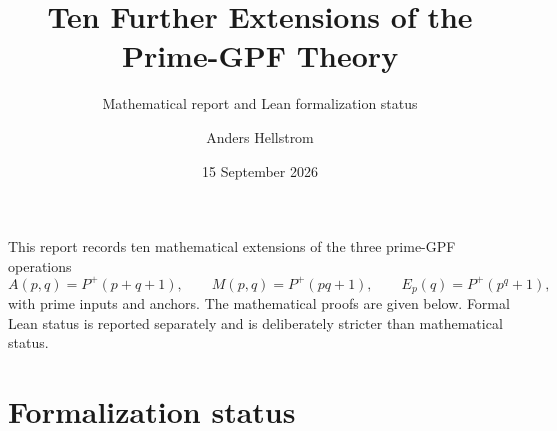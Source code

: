 \documentclass[10pt,a4paper]{scrartcl}
\title{Ten Further Extensions of the Prime-GPF Theory}
\subtitle{Mathematical report and Lean formalization status}
\author{Anders Hellstrom}
\date{15 September 2026}
\begin{document}
\maketitle
\tableofcontents
\bigskip

This report records ten mathematical extensions of the three prime-GPF operations
\[
A(p,q)=P^+(p+q+1),\qquad
M(p,q)=P^+(pq+1),\qquad
E_p(q)=P^+(p^q+1),
\]
with prime inputs and anchors. The mathematical proofs are given below. Formal Lean status is reported separately and is deliberately stricter than mathematical status.

\section*{Formalization status}
\end{document}
